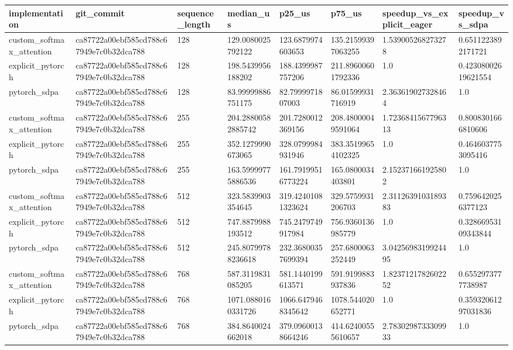 \begin{tabular}{llllllll}
\hline
implementation & git\_commit & sequence\_length & median\_us & p25\_us & p75\_us & speedup\_vs\_explicit\_eager & speedup\_vs\_sdpa \\
\hline
custom\_softmax\_attention & ca87722a00ebf585cd788c67949e7c0b32dca788 & 128 & 129.0080025792122 & 123.6879974603653 & 135.21599397063255 & 1.539005268273278 & 0.6511223892171721 \\
explicit\_pytorch & ca87722a00ebf585cd788c67949e7c0b32dca788 & 128 & 198.5439956188202 & 188.4399987757206 & 211.89600601792336 & 1.0 & 0.42308002619621554 \\
pytorch\_sdpa & ca87722a00ebf585cd788c67949e7c0b32dca788 & 128 & 83.99999886751175 & 82.7999971807003 & 86.01599931716919 & 2.363619027328464 & 1.0 \\
custom\_softmax\_attention & ca87722a00ebf585cd788c67949e7c0b32dca788 & 255 & 204.28800582885742 & 201.7280012369156 & 208.48000049591064 & 1.7236841567796313 & 0.8008301666810606 \\
explicit\_pytorch & ca87722a00ebf585cd788c67949e7c0b32dca788 & 255 & 352.1279990673065 & 328.0799984931946 & 383.35199654102325 & 1.0 & 0.4646037753095416 \\
pytorch\_sdpa & ca87722a00ebf585cd788c67949e7c0b32dca788 & 255 & 163.59999775886536 & 161.79199516773224 & 165.0800034403801 & 2.152371661925802 & 1.0 \\
custom\_softmax\_attention & ca87722a00ebf585cd788c67949e7c0b32dca788 & 512 & 323.5839903354645 & 319.42401081323624 & 329.5759931206703 & 2.3112639103189383 & 0.7596420256377123 \\
explicit\_pytorch & ca87722a00ebf585cd788c67949e7c0b32dca788 & 512 & 747.8879988193512 & 745.2479749917984 & 756.9360136985779 & 1.0 & 0.32866953109343844 \\
pytorch\_sdpa & ca87722a00ebf585cd788c67949e7c0b32dca788 & 512 & 245.80799788236618 & 232.36800357699394 & 257.6800063252449 & 3.0425698319924495 & 1.0 \\
custom\_softmax\_attention & ca87722a00ebf585cd788c67949e7c0b32dca788 & 768 & 587.3119831085205 & 581.1440199613571 & 591.9199883937836 & 1.8237121782602252 & 0.6552973777738987 \\
explicit\_pytorch & ca87722a00ebf585cd788c67949e7c0b32dca788 & 768 & 1071.0880160331726 & 1066.6479468345642 & 1078.544020652771 & 1.0 & 0.35932061297031836 \\
pytorch\_sdpa & ca87722a00ebf585cd788c67949e7c0b32dca788 & 768 & 384.8640024662018 & 379.09600138664246 & 414.62400555610657 & 2.7830298733309933 & 1.0 \\

\end{tabular}
